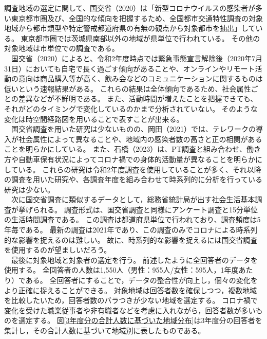 \documentclass[paper={210mm,297mm},line_length=35zw,number_of_lines=31,head_space=30mm,gutter=40mm,baselineskip=2.0zw,headfoot_verticalposition=1.5zw]{jlreq}
\begin{document}
調査地域の選定に関して、国交省（2020）は「新型コロナウイルスの感染者が多い東京都市圏及び、全国的な傾向を把握するため、全国都市交通特性調査の対象地域から都市類型や特定警戒都道府県の有無の観点から対象都市を抽出」している。
東京都市圏では茨城県南部以外の地域が県単位で行われている。
その他の対象地域は市単位での調査である。\\
　国交省（2020）によると、令和2年度時点では緊急事態宣言解除後（2020年7月31日）においても自宅で長く過ごす傾向があることや、オンラインやリモート活動の意向は商品購入等が高く、飲み会などのコミュニケーションに関するものは低いという速報結果がある。
これらの結果は全体傾向であるため、社会属性ごとの差異などが不鮮明である。
また、活動時間が増えたことを把握できても、それがどのタイミングで変化しているのかまで分析されていない。
そのような変化は時空間経路図を用いることで表すことが出来る。\\
　国交省調査を用いた研究は少ないものの、岡田（2021）では、テレワークの導入が社会属性によって異なることや、地域内の感染者数の高さと正の相関があることを明らかにしている。
また、石橋（2023）は、PT調査と組み合わせ、働き方や自動車保有状況によってコロナ禍での身体的活動量が異なることを明らかにしている。
これらの研究は令和2年度調査を使用していることが多く、それ以降の調査を用いた研究や、各調査年度を組み合わせて時系列的に分析を行っている研究は少ない。\\
　次に国交省調査に類似するデータとして，総務省統計局が出す社会生活基本調査が挙げられる。
調査形式は、国交省調査と同様にアンケート調査と15分単位の生活時間調査である。
この調査は都道府県単位で行われており、調査頻度は5年毎である。
最新の調査は2021年であり、この調査のみでコロナによる時系列的な影響を捉えるのは難しい。
故に、時系列的な影響を捉えるには国交省調査を使用するのが望ましいだろう。\\
　最後に対象地域と対象者の選定を行う。
前述したように全回答者のデータを使用する。
全回答者の人数は1,550人（男性：955人/女性：595人，1年度あたり）である。
全回答者にすることで，データの整合性が向上し，個々の変化をより正確に捉えることができる。
対象地域は回答者数を確保しつつ，複数地域を比較したいため，回答者数のバラつきが少ない地域を選定する。
コロナ禍で変化を受けた職業従事者や非有職者などを考慮に入れながら，回答者数が多いものを選定する。
図\ref{3年度分の合計人数に基づいた地域分布}は3年度分の回答者を集計し，その合計人数に基づいて地域別に表したものである。\\
\end{document}
